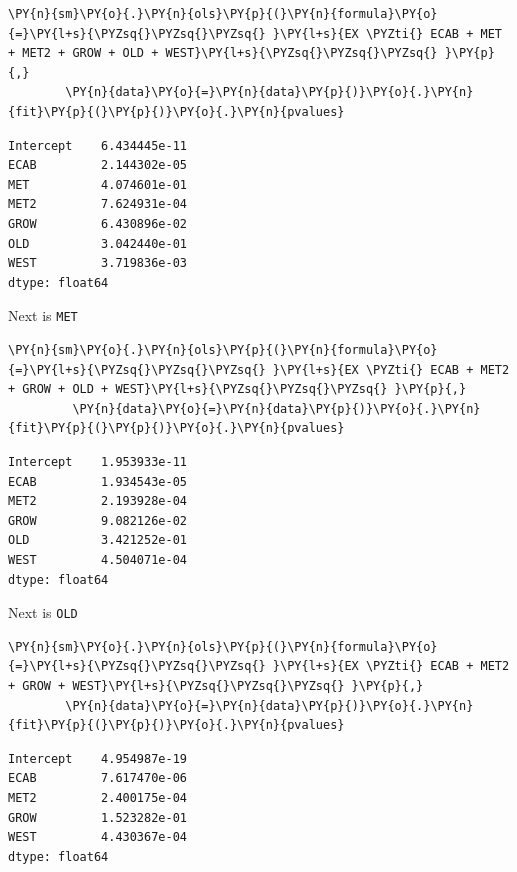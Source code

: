 \documentclass[10pt]{article}\usepackage[]{graphicx}\usepackage[]{xcolor}
\begin{document}
    \begin{Verbatim}[commandchars=\\\{\}]
\PY{n}{sm}\PY{o}{.}\PY{n}{ols}\PY{p}{(}\PY{n}{formula}\PY{o}{=}\PY{l+s}{\PYZsq{}\PYZsq{}\PYZsq{} }\PY{l+s}{EX \PYZti{} ECAB + MET + MET2 + GROW + OLD + WEST}\PY{l+s}{\PYZsq{}\PYZsq{}\PYZsq{} }\PY{p}{,}
        \PY{n}{data}\PY{o}{=}\PY{n}{data}\PY{p}{)}\PY{o}{.}\PY{n}{fit}\PY{p}{(}\PY{p}{)}\PY{o}{.}\PY{n}{pvalues}
\end{Verbatim}

            \begin{Verbatim}[commandchars=\\\{\}]
Intercept    6.434445e-11
ECAB         2.144302e-05
MET          4.074601e-01
MET2         7.624931e-04
GROW         6.430896e-02
OLD          3.042440e-01
WEST         3.719836e-03
dtype: float64
\end{Verbatim}
        
    Next is \texttt{MET}

    \begin{Verbatim}[commandchars=\\\{\}]
\PY{n}{sm}\PY{o}{.}\PY{n}{ols}\PY{p}{(}\PY{n}{formula}\PY{o}{=}\PY{l+s}{\PYZsq{}\PYZsq{}\PYZsq{} }\PY{l+s}{EX \PYZti{} ECAB + MET2 + GROW + OLD + WEST}\PY{l+s}{\PYZsq{}\PYZsq{}\PYZsq{} }\PY{p}{,}
         \PY{n}{data}\PY{o}{=}\PY{n}{data}\PY{p}{)}\PY{o}{.}\PY{n}{fit}\PY{p}{(}\PY{p}{)}\PY{o}{.}\PY{n}{pvalues}
\end{Verbatim}

            \begin{Verbatim}[commandchars=\\\{\}]
Intercept    1.953933e-11
ECAB         1.934543e-05
MET2         2.193928e-04
GROW         9.082126e-02
OLD          3.421252e-01
WEST         4.504071e-04
dtype: float64
\end{Verbatim}
        
    Next is \texttt{OLD}

    \begin{Verbatim}[commandchars=\\\{\}]
\PY{n}{sm}\PY{o}{.}\PY{n}{ols}\PY{p}{(}\PY{n}{formula}\PY{o}{=}\PY{l+s}{\PYZsq{}\PYZsq{}\PYZsq{} }\PY{l+s}{EX \PYZti{} ECAB + MET2 + GROW + WEST}\PY{l+s}{\PYZsq{}\PYZsq{}\PYZsq{} }\PY{p}{,}
        \PY{n}{data}\PY{o}{=}\PY{n}{data}\PY{p}{)}\PY{o}{.}\PY{n}{fit}\PY{p}{(}\PY{p}{)}\PY{o}{.}\PY{n}{pvalues}
\end{Verbatim}

            \begin{Verbatim}[commandchars=\\\{\}]
Intercept    4.954987e-19
ECAB         7.617470e-06
MET2         2.400175e-04
GROW         1.523282e-01
WEST         4.430367e-04
dtype: float64
\end{Verbatim}
        
\end{document}

